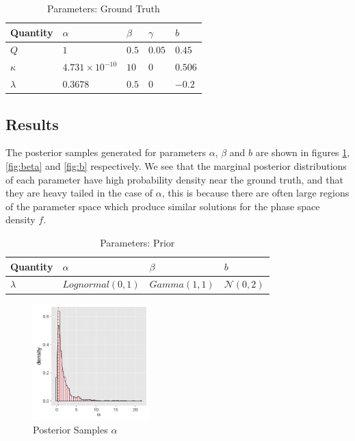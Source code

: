 \documentclass{article}
\begin{document}
\begin{table}[t]
  \caption{Parameters: Ground Truth}
  \label{tab:ground-truth}
  \centering
  \begin{tabular}{lllll}
    \toprule
    \cmidrule{1-2}
    Quantity     & $\alpha$     & $\beta$ & $\gamma$ & $b$ \\
    \midrule
    $Q$ & $1$  & $0.5$ & $0.05$  & $0.45$     \\
    $\kappa$  & $4.731 \times 10^{-10}$ & $10$  & $0$ & $0.506$ \\
    $\lambda$ & $0.3678$ & $0.5$  & $0$ & $-0.2$ \\
    \bottomrule
  \end{tabular}
\end{table}

\subsection*{Results}

The posterior samples generated for parameters $\alpha$, $\beta$ and $b$ are shown
in figures \ref{fig:alpha}, \ref{fig:beta} and \ref{fig:b} respectively. We see that
the marginal posterior distributions of each parameter have high probability 
density near the ground truth, and that they are heavy tailed in the case of $\alpha$, 
this is because there are often large regions of the parameter space which produce similar
solutions for the phase space density $f$. 

\begin{table}[t]
  \caption{Parameters: Prior}
  \label{tab:prior}
  \centering
  \begin{tabular}{llll}
    \toprule
    \cmidrule{1-2}
    Quantity     & $\alpha$     & $\beta$ & $b$ \\
    \midrule
    $\lambda$ & $Lognormal(0, 1)$ & $Gamma(1, 1)$ & $\mathcal{N}(0, 2)$ \\
    \bottomrule
  \end{tabular}
\end{table}


\begin{figure}[h] 
  \centering
  \includegraphics[width=0.4\textwidth]{histogram_alpha_posterior}
  \caption{Posterior Samples $\alpha$}
  \label{fig:alpha}
\end{figure}
\end{document}
